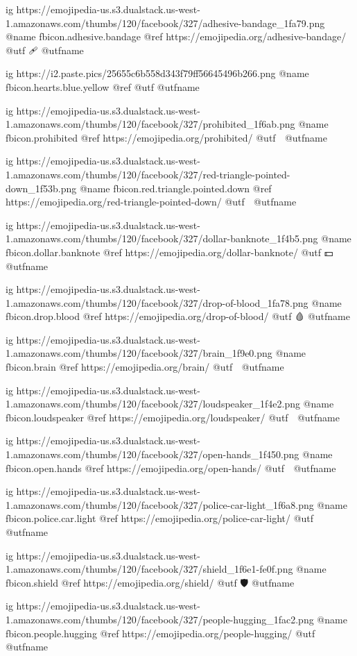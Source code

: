 	ig https://emojipedia-us.s3.dualstack.us-west-1.amazonaws.com/thumbs/120/facebook/327/adhesive-bandage_1fa79.png
	@name fbicon.adhesive.bandage
	@ref https://emojipedia.org/adhesive-bandage/
	@utf 🩹
	@utfname

	ig https://i2.paste.pics/25655c6b558d343f79ff56645496b266.png
	@name fbicon.hearts.blue.yellow
	@ref
	@utf
	@utfname

	ig https://emojipedia-us.s3.dualstack.us-west-1.amazonaws.com/thumbs/120/facebook/327/prohibited_1f6ab.png
	@name fbicon.prohibited
	@ref https://emojipedia.org/prohibited/
	@utf 🚫
	@utfname

	ig https://emojipedia-us.s3.dualstack.us-west-1.amazonaws.com/thumbs/120/facebook/327/red-triangle-pointed-down_1f53b.png
	@name fbicon.red.triangle.pointed.down
	@ref https://emojipedia.org/red-triangle-pointed-down/
	@utf 🔻
	@utfname

	ig https://emojipedia-us.s3.dualstack.us-west-1.amazonaws.com/thumbs/120/facebook/327/dollar-banknote_1f4b5.png
	@name fbicon.dollar.banknote
	@ref https://emojipedia.org/dollar-banknote/
	@utf 💵
	@utfname

	ig https://emojipedia-us.s3.dualstack.us-west-1.amazonaws.com/thumbs/120/facebook/327/drop-of-blood_1fa78.png
	@name fbicon.drop.blood
	@ref https://emojipedia.org/drop-of-blood/
	@utf 🩸
	@utfname

	ig https://emojipedia-us.s3.dualstack.us-west-1.amazonaws.com/thumbs/120/facebook/327/brain_1f9e0.png
	@name fbicon.brain
	@ref https://emojipedia.org/brain/
	@utf 🧠
	@utfname

	ig https://emojipedia-us.s3.dualstack.us-west-1.amazonaws.com/thumbs/120/facebook/327/loudspeaker_1f4e2.png
	@name fbicon.loudspeaker
	@ref https://emojipedia.org/loudspeaker/
	@utf 📢
	@utfname

	ig https://emojipedia-us.s3.dualstack.us-west-1.amazonaws.com/thumbs/120/facebook/327/open-hands_1f450.png
	@name fbicon.open.hands
	@ref https://emojipedia.org/open-hands/
	@utf 👐
	@utfname

	ig https://emojipedia-us.s3.dualstack.us-west-1.amazonaws.com/thumbs/120/facebook/327/police-car-light_1f6a8.png
	@name fbicon.police.car.light
	@ref https://emojipedia.org/police-car-light/
	@utf 🚨
	@utfname

	ig https://emojipedia-us.s3.dualstack.us-west-1.amazonaws.com/thumbs/120/facebook/327/shield_1f6e1-fe0f.png
	@name fbicon.shield
	@ref https://emojipedia.org/shield/
	@utf 🛡
	@utfname

	ig https://emojipedia-us.s3.dualstack.us-west-1.amazonaws.com/thumbs/120/facebook/327/people-hugging_1fac2.png
	@name fbicon.people.hugging
	@ref https://emojipedia.org/people-hugging/
	@utf
	@utfname

